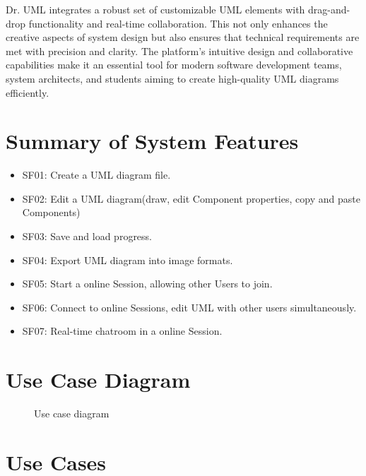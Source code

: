 \documentclass[12pt]{article}
\begin{document}
Dr. UML integrates a robust set of customizable UML elements with drag-and-drop functionality and real-time collaboration. This not only enhances the creative aspects of system design but also ensures that technical requirements are met with precision and clarity. The platform's intuitive design and collaborative capabilities make it an essential tool for modern software development teams, system architects, and students aiming to create high-quality UML diagrams efficiently.



\section{Summary of System Features}

\begin{itemize}
    \item SF01: Create a UML diagram file.
    \item SF02: Edit a UML diagram(draw, edit Component properties, copy and paste Components)
    \item SF03: Save and load progress.
    \item SF04: Export UML diagram into image formats.
    \item SF05: Start a online Session, allowing other Users to join.
    \item SF06: Connect to online Sessions, edit UML with other users simultaneously.
    \item SF07: Real-time chatroom in a online Session.
\end{itemize}


\section{Use Case Diagram}

\begin{figure}[htbp]
  \centering
  
  \caption{Use case diagram}
\end{figure}

\section{Use Cases}
\end{document}
